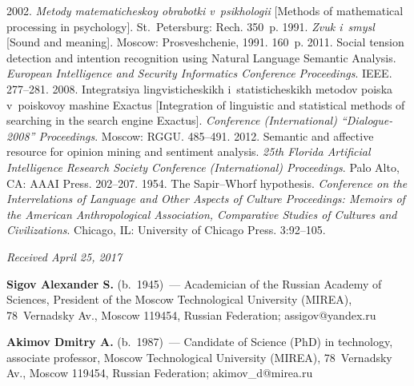 \begin{multicols}{2}
{{\begin{thebibliography}{99}
 2002. \textit{Metody matematicheskoy obrabotki 
v~psikhologii} [Methods of mathematical processing in psychology]. St.\ Petersburg: 
Rech. 350~p.
 1991. \textit{Zvuk i~smysl} [Sound and meaning]. Moscow: 
Prosveshchenie, 1991. 160~p.
 2011. Social tension detection and 
intention recognition using Natural Language Semantic Analysis. 
\textit{European Intelligence and Security Informatics Conference 
Proceedings}. IEEE. 277--281.
 2008. In\-te\-gra\-tsiya lingvisticheskikh 
i~statisticheskikh metodov poiska v~poiskovoy mashine Exactus [Integration of 
linguistic and statistical methods of searching in the search engine Exactus]. 
\textit{Conference (International) 
``Dialogue-2008'' Proceedings}. Moscow: RGGU. 485--491.
 2012. Semantic and affective 
resource for opinion mining and sentiment analysis. \textit{25th  
Florida Artificial Intelligence Research Society Conference (International)
Proceedings}. Palo Alto, CA: AAAI Press. 202--207.
 1954. The Sapir--Whorf hypothesis. \textit{Conference on the 
Interrelations of Language and Other Aspects of Culture Proceedings: Memoirs of the 
American Anthropological Association, Comparative Studies of Cultures and 
Civilizations}. Chicago, IL: University of Chicago Press. 3:92--105.
\end{thebibliography}

 }
 }

\end{multicols}

\vspace*{-3pt}

\hfill{\small\textit{Received April 25, 2017}}
  
\Contr

\noindent
\textbf{Sigov Alexander S.} (b.\ 1945)~--- Academician of the Russian Academy of 
Sciences, President of the Moscow Technological University (MIREA), 
78~Vernadsky Av., Moscow 119454, Russian Federation; 
\mbox{assigov@yandex.ru}

\vspace*{3pt}

\noindent
\textbf{Akimov Dmitry A.} (b.\ 1987)~--- Candidate of Science (PhD) in 
technology, associate professor, Moscow Technological University (MIREA), 
78~Vernadsky Av., Moscow 119454, Russian Federation; 
\mbox{akimov\_d@mirea.ru}

